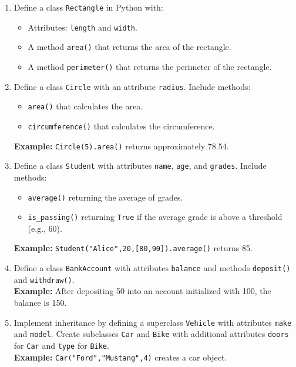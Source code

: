 \documentclass{article}
\begin{document}
\begin{enumerate}
    \item Define a class \texttt{Rectangle} in Python with:
    \begin{itemize}
        \item Attributes: \texttt{length} and \texttt{width}.
        \item A method \texttt{area()} that returns the area of the rectangle.
        \item A method \texttt{perimeter()} that returns the perimeter of the rectangle.
    \end{itemize}

    \item Define a class \texttt{Circle} with an attribute \texttt{radius}. Include methods:
    \begin{itemize}
        \item \texttt{area()} that calculates the area.
        \item \texttt{circumference()} that calculates the circumference.
    \end{itemize}
    \textbf{Example:} \texttt{Circle(5).area()} returns approximately 78.54.

    \item Define a class \texttt{Student} with attributes \texttt{name}, \texttt{age}, and \texttt{grades}. Include methods:
    \begin{itemize}
        \item \texttt{average()} returning the average of grades.
        \item \texttt{is\_passing()} returning \texttt{True} if the average grade is above a threshold (e.g., 60).
    \end{itemize}
    \textbf{Example:} \texttt{Student("Alice",20,[80,90]).average()} returns 85.

    \item Define a class \texttt{BankAccount} with attributes \texttt{balance} and methods \texttt{deposit()} and \texttt{withdraw()}.\\
    \textbf{Example:} After depositing 50 into an account initialized with 100, the balance is 150.

    \item Implement inheritance by defining a superclass \texttt{Vehicle} with attributes \texttt{make} and \texttt{model}. Create subclasses \texttt{Car} and \texttt{Bike} with additional attributes \texttt{doors} for \texttt{Car} and \texttt{type} for \texttt{Bike}.\\
    \textbf{Example:} \texttt{Car("Ford","Mustang",4)} creates a car object.
\end{enumerate}
\end{document}
